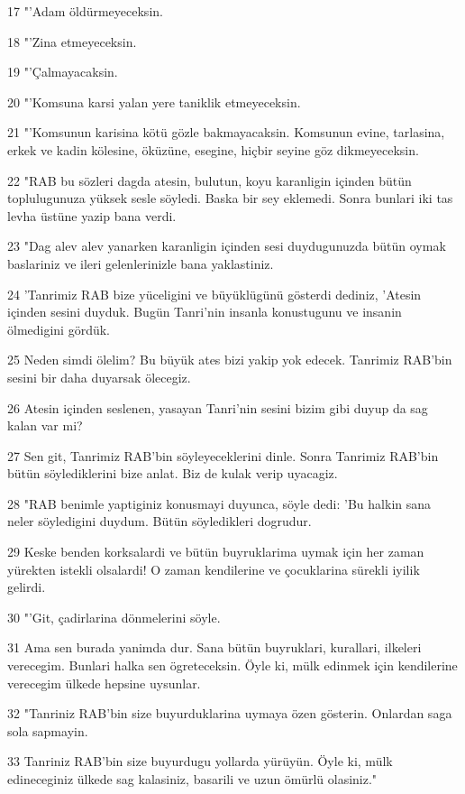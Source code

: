 \par 17 "'Adam öldürmeyeceksin.
\par 18 "'Zina etmeyeceksin.
\par 19 "'Çalmayacaksin.
\par 20 "'Komsuna karsi yalan yere taniklik etmeyeceksin.
\par 21 "'Komsunun karisina kötü gözle bakmayacaksin. Komsunun evine, tarlasina, erkek ve kadin kölesine, öküzüne, esegine, hiçbir seyine göz dikmeyeceksin.
\par 22 "RAB bu sözleri dagda atesin, bulutun, koyu karanligin içinden bütün toplulugunuza yüksek sesle söyledi. Baska bir sey eklemedi. Sonra bunlari iki tas levha üstüne yazip bana verdi.
\par 23 "Dag alev alev yanarken karanligin içinden sesi duydugunuzda bütün oymak baslariniz ve ileri gelenlerinizle bana yaklastiniz.
\par 24 'Tanrimiz RAB bize yüceligini ve büyüklügünü gösterdi dediniz, 'Atesin içinden sesini duyduk. Bugün Tanri'nin insanla konustugunu ve insanin ölmedigini gördük.
\par 25 Neden simdi ölelim? Bu büyük ates bizi yakip yok edecek. Tanrimiz RAB'bin sesini bir daha duyarsak ölecegiz.
\par 26 Atesin içinden seslenen, yasayan Tanri'nin sesini bizim gibi duyup da sag kalan var mi?
\par 27 Sen git, Tanrimiz RAB'bin söyleyeceklerini dinle. Sonra Tanrimiz RAB'bin bütün söylediklerini bize anlat. Biz de kulak verip uyacagiz.
\par 28 "RAB benimle yaptiginiz konusmayi duyunca, söyle dedi: 'Bu halkin sana neler söyledigini duydum. Bütün söyledikleri dogrudur.
\par 29 Keske benden korksalardi ve bütün buyruklarima uymak için her zaman yürekten istekli olsalardi! O zaman kendilerine ve çocuklarina sürekli iyilik gelirdi.
\par 30 "'Git, çadirlarina dönmelerini söyle.
\par 31 Ama sen burada yanimda dur. Sana bütün buyruklari, kurallari, ilkeleri verecegim. Bunlari halka sen ögreteceksin. Öyle ki, mülk edinmek için kendilerine verecegim ülkede hepsine uysunlar.
\par 32 "Tanriniz RAB'bin size buyurduklarina uymaya özen gösterin. Onlardan saga sola sapmayin.
\par 33 Tanriniz RAB'bin size buyurdugu yollarda yürüyün. Öyle ki, mülk edineceginiz ülkede sag kalasiniz, basarili ve uzun ömürlü olasiniz."


